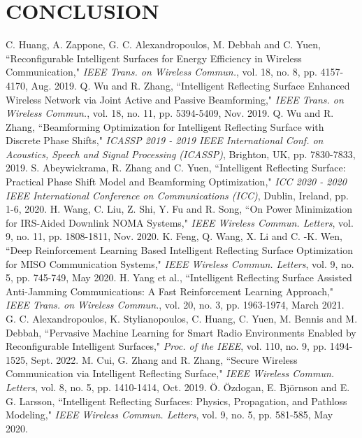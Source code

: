 \documentclass{IEEEoj}
\begin{document}
\section{CONCLUSION} \label{sec:conclusion}

\begin{thebibliography}{00}
	 C. Huang, A. Zappone, G. C. Alexandropoulos, M. Debbah and C. Yuen, “Reconfigurable Intelligent Surfaces for Energy Efficiency in Wireless Communication," \textit{IEEE Trans. on Wireless Commun.}, vol. 18, no. 8, pp. 4157-4170, Aug. 2019.
	 Q. Wu and R. Zhang, “Intelligent Reflecting Surface Enhanced Wireless Network via Joint Active and Passive Beamforming," \textit{IEEE Trans. on Wireless Commun.}, vol. 18, no. 11, pp. 5394-5409, Nov. 2019.
	 Q. Wu and R. Zhang, “Beamforming Optimization for Intelligent Reflecting Surface with Discrete Phase Shifts," \textit{ICASSP 2019 - 2019 IEEE International Conf. on Acoustics, Speech and Signal Processing (ICASSP)}, Brighton, UK, pp. 7830-7833, 2019.
	 S. Abeywickrama, R. Zhang and C. Yuen, “Intelligent Reflecting Surface: Practical Phase Shift Model and Beamforming Optimization," \textit{ICC 2020 - 2020 IEEE International Conference on Communications (ICC)}, Dublin, Ireland, pp. 1-6, 2020.
	 H. Wang, C. Liu, Z. Shi, Y. Fu and R. Song, “On Power Minimization for IRS-Aided Downlink NOMA Systems," \textit{IEEE Wireless Commun. Letters}, vol. 9, no. 11, pp. 1808-1811, Nov. 2020.
	 K. Feng, Q. Wang, X. Li and C. -K. Wen, “Deep Reinforcement Learning Based Intelligent Reflecting Surface Optimization for MISO Communication Systems," \textit{IEEE Wireless Commun. Letters}, vol. 9, no. 5, pp. 745-749, May 2020.
	 H. Yang et al., “Intelligent Reflecting Surface Assisted Anti-Jamming Communications: A Fast Reinforcement Learning Approach," \textit{IEEE Trans. on Wireless Commun.}, vol. 20, no. 3, pp. 1963-1974, March 2021.
	 G. C. Alexandropoulos, K. Stylianopoulos, C. Huang, C. Yuen, M. Bennis and M. Debbah, “Pervasive Machine Learning for Smart Radio Environments Enabled by Reconfigurable Intelligent Surfaces," \textit{Proc. of the IEEE}, vol. 110, no. 9, pp. 1494-1525, Sept. 2022.
	 M. Cui, G. Zhang and R. Zhang, “Secure Wireless Communication via Intelligent Reflecting Surface," \textit{IEEE Wireless Commun. Letters}, vol. 8, no. 5, pp. 1410-1414, Oct. 2019.
	 Ö. Özdogan, E. Björnson and E. G. Larsson, “Intelligent Reflecting Surfaces: Physics, Propagation, and Pathloss Modeling," \textit{IEEE Wireless Commun. Letters}, vol. 9, no. 5, pp. 581-585, May 2020.

\end{thebibliography}
\end{document}
